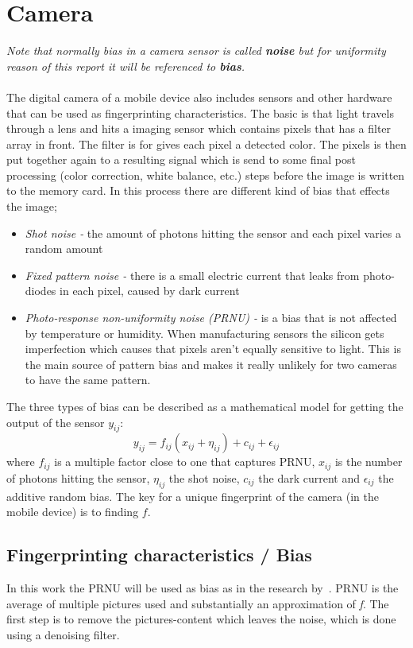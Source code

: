 \section{Camera}\label{sec:char:camera}
\textit{Note that normally bias in a camera sensor is called \textbf{noise} but for uniformity reason of this report it will be referenced to \textbf{bias}.}\\
\\
The digital camera of a mobile device also includes sensors and other hardware that can be used as fingerprinting characteristics. The basic is that light travels through a lens and hits a imaging sensor which contains pixels that has a filter array in front. The filter is for gives each pixel a detected color. The pixels is then put together again to a resulting signal which is send to some final post processing (color correction, white balance, etc.) steps before the image is written to the memory card. In this process there are different kind of bias that effects the image;
\begin{itemize}
	\item[] \textit{Shot noise -} the amount of photons hitting the sensor and each pixel varies a random amount
	\item[] \textit{Fixed pattern noise - }there is a small electric current that leaks from photo-diodes in each pixel, caused by dark current
	\item[] \textit{Photo-response non-uniformity noise (PRNU) -} is a bias that is not affected by temperature or humidity. When manufacturing sensors the silicon gets imperfection which causes that pixels aren't equally sensitive to light. This is the main source of pattern bias and makes it really unlikely for two cameras to have the same pattern.
\end{itemize}
The three types of bias can be described as a mathematical model for getting the output of the sensor $y_{ij}$:
$$y_{ij}=f_{ij}(x_{ij}+\eta_{ij})+c_{ij}+\epsilon_{ij}$$
where $f_{ij}$ is a multiple factor close to one that captures PRNU, $x_{ij}$ is the number of photons hitting the sensor, $\eta_{ij}$ the shot noise, $c_{ij}$ the dark current and $\epsilon_{ij}$ the additive random bias. The key for a unique fingerprint of the camera (in the mobile device) is to finding $f$.~\cite[]{sensor:camera:DCIdent}

\subsection{Fingerprinting characteristics / Bias}
In this work the PRNU will be used as bias as in the research by~\cite{sensor:camera:DCIdent}. PRNU is the average of multiple pictures used and substantially an approximation of \textit{f}. The first step is to remove the pictures-content which leaves the noise, which is done using a denoising filter. 

